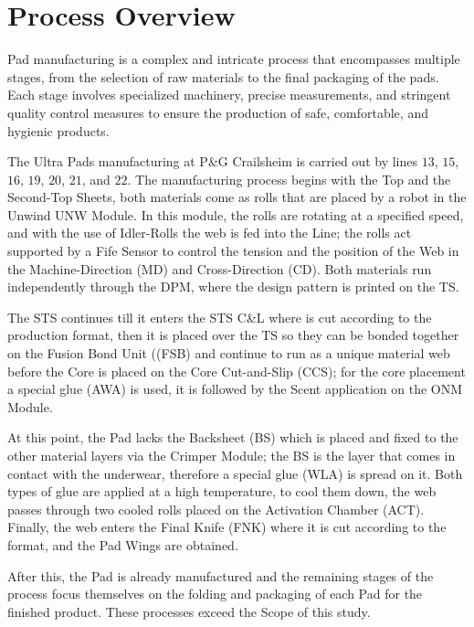 \chapter{Process Overview}\label{Ch2}

Pad manufacturing is a complex and intricate process that encompasses multiple stages, from the selection of raw materials to the final packaging of the pads. Each stage involves specialized machinery, precise measurements, and stringent quality control measures to ensure the production of safe, comfortable, and hygienic products. 

The Ultra Pads manufacturing at P\&G Crailsheim is carried out by lines $13$, $15$, $16$, $19$, $20$, $21$, and $22$. The manufacturing process begins with the Top and the Second-Top Sheets, both materials come as rolls that are placed by a robot in the Unwind UNW Module. In this module, the rolls are rotating at a specified speed, and with the use of Idler-Rolls the web is fed into the Line; the rolls act supported by a Fife Sensor to control the tension and the position of the Web in the Machine-Direction (MD) and Cross-Direction (CD). Both materials run independently through the DPM, where the design pattern is printed on the TS.

The STS continues till it enters the STS C\&L where is cut according to the production format, then it is placed over the TS so they can be bonded together on the Fusion Bond Unit ((FSB) and continue to run as a unique material web before the Core is placed on the Core Cut-and-Slip (CCS); for the core placement a special glue (AWA) is used, it is followed by the Scent application on the ONM Module. 

At this point, the Pad lacks the Backsheet (BS) which is placed and fixed to the other material layers via the Crimper Module; the BS is the layer that comes in contact with the underwear, therefore a special glue (WLA) is spread on it. Both types of glue are applied at a high temperature, to cool them down, the web passes through two cooled rolls placed on the Activation Chamber (ACT). Finally, the web enters the Final Knife (FNK) where it is cut according to the format, and the Pad Wings are obtained.

After this, the Pad is already manufactured and the remaining stages of the process focus themselves on the folding and packaging of each Pad for the finished product. These processes exceed the Scope of this study.


